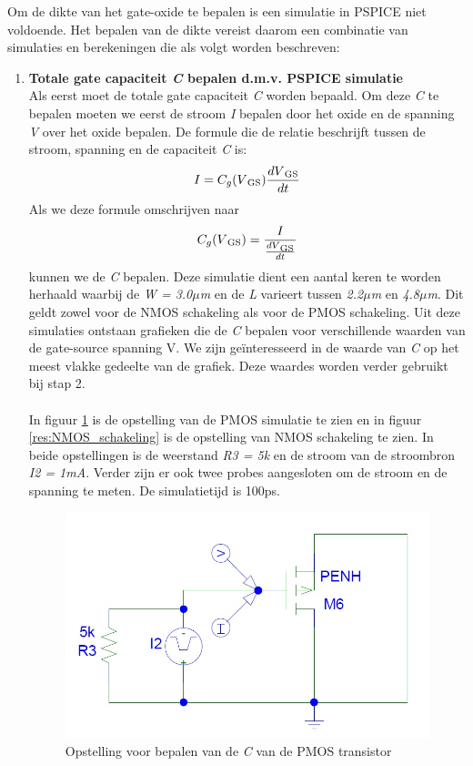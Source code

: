 

Om de dikte van het gate-oxide te bepalen is een simulatie in PSPICE niet voldoende. Het bepalen van de dikte vereist daarom een combinatie van simulaties en berekeningen die als volgt worden beschreven:
\begin{enumerate}
\item{\textbf{Totale gate capaciteit \emph{C} bepalen d.m.v. PSPICE simulatie}}
\\
Als eerst moet de totale gate capaciteit \emph{C} worden bepaald. Om deze \emph{C} te bepalen moeten we eerst de stroom \emph{I} bepalen door het oxide en de spanning \emph{V} over het oxide bepalen. De formule die de relatie beschrijft tussen de stroom, spanning en de capaciteit \emph{C} is:
\begin{equation}
I = C_g(V\textsubscript{GS}) \frac{dV\textsubscript{GS}}{dt}
\end{equation}
Als we deze formule omschrijven naar
 \begin{equation}
 C_g(V\textsubscript{GS})= \frac{I}{ \frac{dV\textsubscript{GS}}{dt}}
 \end{equation}
kunnen we de \emph{C} bepalen. Deze simulatie dient een aantal keren te worden herhaald waarbij de \emph{W = 3.0$\mu$m} en de \emph{L} varieert tussen \emph{2.2$\mu$m} en \emph{4.8$\mu$m}. Dit geldt zowel voor de NMOS schakeling als voor de PMOS schakeling. Uit deze simulaties ontstaan grafieken die de \emph{C} bepalen voor verschillende waarden van de gate-source spanning V. We zijn geïnteresseerd in de waarde van \emph{C} op het meest vlakke gedeelte van de grafiek. Deze waardes worden verder gebruikt bij stap 2.
\\
\\In figuur \ref{res:PMOS_schakeling} is de opstelling van de PMOS simulatie te zien en in figuur \ref{res:NMOS_schakeling} is de opstelling van NMOS schakeling te zien. In beide opstellingen is de weerstand \emph{R3 = 5k\textohm} en de stroom van de stroombron \emph{I2 = 1mA}. Verder zijn er ook twee probes aangesloten om de stroom en de spanning te meten. De simulatietijd is 100ps.

 \begin{figure} [h!]
 \includegraphics [scale = 0.7] {figures/PMOS}
 \caption{Opstelling voor bepalen van de \emph{C} van de PMOS transistor}
 \label{res:PMOS_schakeling}
 \end{figure}


\end{enumerate}
